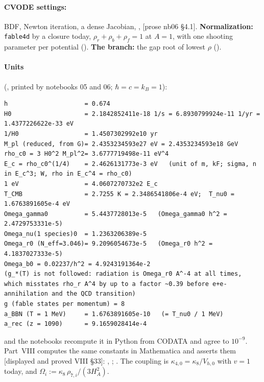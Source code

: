 \paragraph{CVODE settings:} BDF, Newton iteration, a dense Jacobian, ,
 [prose nb06 \S4.1]. \textbf{Normalization:} \texttt{fable4d} by a closure today,
$\rho_r+\rho_b+\rho_f=1$ at $A=1$, with one shooting parameter per potential (). \textbf{The
branch:} the gap root of lowest $\rho$ ().

\paragraph{Units} (, printed by notebooks 05 and 06; $\hbar=c=k_B=1$):
\begin{Verbatim}[fontsize=\scriptsize]
h                     = 0.674
H0                    = 2.1842852411e-18 1/s = 6.8930799924e-11 1/yr = 1.4377226622e-33 eV
1/H0                  = 1.4507302992e10 yr
M_pl (reduced, from G)= 2.4353234593e27 eV = 2.4353234593e18 GeV
rho_c0 = 3 H0^2 M_pl^2= 3.6777719498e-11 eV^4
E_c = rho_c0^(1/4)    = 2.4626131773e-3 eV   (unit of m, kF; sigma, n in E_c^3; W, rho in E_c^4 = rho_c0)
1 eV                  = 4.0607270732e2 E_c
T_CMB                 = 2.7255 K = 2.3486541806e-4 eV;  T_nu0 = 1.6763891605e-4 eV
Omega_gamma0          = 5.4437728013e-5   (Omega_gamma0 h^2 = 2.4729753331e-5)
Omega_nu(1 species)0  = 1.2363206389e-5
Omega_r0 (N_eff=3.046)= 9.2096054673e-5   (Omega_r0 h^2 = 4.1837027333e-5)
Omega_b0 = 0.02237/h^2 = 4.9243191364e-2
(g_*(T) is not followed: radiation is Omega_r0 A^-4 at all times, which misstates rho_r A^4 by up to a factor ~0.39 before e+e- annihilation and the QCD transition)
g (fable states per momentum) = 8
a_BBN (T = 1 MeV)     = 1.6763891605e-10   (= T_nu0 / 1 MeV)
a_rec (z = 1090)      = 9.1659028414e-4
\end{Verbatim}
and the notebooks recompute it in Python from CODATA and agree to $10^{-9}$. Part~VIII computes the same
constants in Mathematica and asserts them [displayed and proved VIII \S33]:
,
;
. The coupling is $\kappa_{4,0}=\kappa_8/V_{h,0}$ with $v=1$ today, and
$\Omega_i:=\kappa_8\,\rho_{7,i}/(3H_A^2)$.


